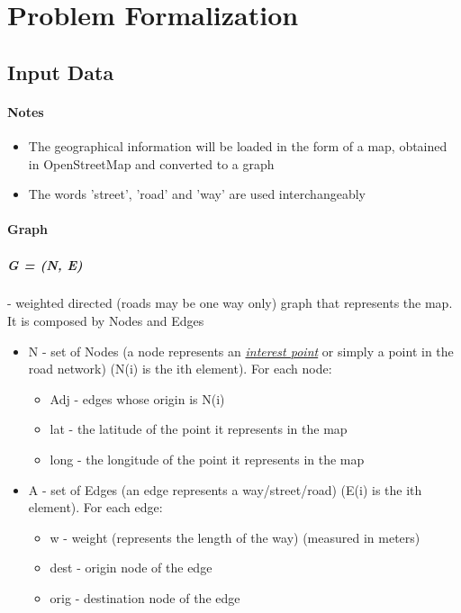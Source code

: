 \chapter{Problem Formalization}



\section{Input Data}


\subsubsection{Notes}
\begin{itemize}
    \item The geographical information will be loaded in the form of a map, obtained in OpenStreetMap and converted to a graph
    \item The words 'street', 'road' and 'way' are used interchangeably
\end{itemize}


\subsubsection{Graph}
\paragraph{G = (N, E)} - weighted directed (roads may be one way only) graph that represents the map. It is composed by Nodes and Edges
\begin{itemize}

	\item N - set of Nodes (a node represents an \uline{\textit{interest point}} or simply a point in the road network) (N(i) is the ith element). For each node:
\begin{itemize}
	\item Adj - edges whose origin is N(i)
	\item lat - the latitude of the point it represents in the map
	\item long - the longitude of the point it represents in the map
\end{itemize}

	\item A - set of Edges (an edge represents a way/street/road) (E(i) is the ith element). For each edge:
\begin{itemize}
	\item w - weight (represents the length of the way) (measured in meters)
	\item dest - origin node of the edge
	\item orig - destination node of the edge
\end{itemize}

\end{itemize}

